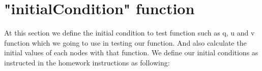 \documentclass{report}
\begin{document}
\section{"initialCondition" function}
At this section we define the initial condition to test function such as q, u and v function which we going to use in testing our function. And also calculate the initial values of each nodes with that function. We define our initial conditions as instructed in the homework instructions as following:
\begin{algorithm}
\end{algorithm}
\end{document}
